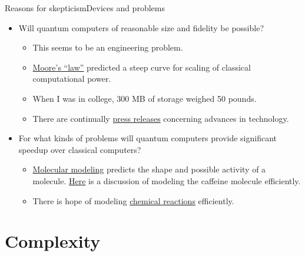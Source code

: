 \begin{frame}{Reasons for skepticism}{Devices and problems}

\begin{itemize}[<+->]
    \item Will quantum computers of reasonable size and fidelity be possible?
    \begin{itemize}
        \item This seems to be an engineering problem.
        \item \href{https://en.wikipedia.org/wiki/Moore's_law}{Moore's ``law''} predicted a steep curve for scaling of classical computational power.
        \item When I was in college, 300 MB of storage weighed 50 pounds.
        \item There are continually \href{https://www.google.com/search?q=quantum+computing+advances&rlz=1C5CHFA_enUS706US706&oq=quantum+computing+advances&ie=UTF-8}{press releases} concerning advances in technology.
    \end{itemize}
    \item For what kinds of problems will quantum computers provide significant speedup over classical computers?
    \begin{itemize}
        \item  \href{https://en.wikipedia.org/wiki/Molecular_modelling}{Molecular modeling} predicts the shape and possible activity of a molecule.  \href{https://venturebeat.com/2019/07/14/ibm-research-explains-how-quantum-computing-works-and-could-be-the-the-supercomputer-of-the-future/}{Here} is a discussion of modeling the caffeine molecule efficiently.
        \item There is hope of modeling \href{https://www.newscientist.com/article/2253089-google-performed-the-first-quantum-simulation-of-a-chemical-reaction/}{chemical reactions} efficiently.
    \end{itemize}
\end{itemize}
    
\end{frame}

\section{Complexity}

